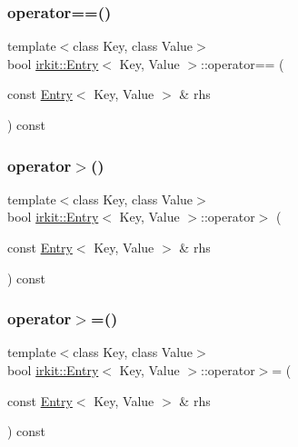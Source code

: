\mbox{\label{structirkit_1_1Entry_aaa12df0ae7e66638a6f0e5ddb552167b}} 
\subsubsection{\texorpdfstring{operator==()}{operator==()}}
{\footnotesize\ttfamily template$<$class Key, class Value$>$ \\
bool \hyperlink{structirkit_1_1Entry}{irkit\+::\+Entry}$<$ Key, Value $>$\+::operator== (\begin{DoxyParamCaption}\item[{const \hyperlink{structirkit_1_1Entry}{Entry}$<$ Key, Value $>$ \&}]{rhs }\end{DoxyParamCaption}) const\hspace{0.3cm}{\ttfamily [inline]}}

\mbox{\label{structirkit_1_1Entry_a0c421723ffe0eb3c56d1efc16f5f2fe5}} 
\subsubsection{\texorpdfstring{operator$>$()}{operator>()}}
{\footnotesize\ttfamily template$<$class Key, class Value$>$ \\
bool \hyperlink{structirkit_1_1Entry}{irkit\+::\+Entry}$<$ Key, Value $>$\+::operator$>$ (\begin{DoxyParamCaption}\item[{const \hyperlink{structirkit_1_1Entry}{Entry}$<$ Key, Value $>$ \&}]{rhs }\end{DoxyParamCaption}) const\hspace{0.3cm}{\ttfamily [inline]}}

\mbox{\label{structirkit_1_1Entry_a672de7d54aa88d29475e8664422a8e4f}} 
\subsubsection{\texorpdfstring{operator$>$=()}{operator>=()}}
{\footnotesize\ttfamily template$<$class Key, class Value$>$ \\
bool \hyperlink{structirkit_1_1Entry}{irkit\+::\+Entry}$<$ Key, Value $>$\+::operator$>$= (\begin{DoxyParamCaption}\item[{const \hyperlink{structirkit_1_1Entry}{Entry}$<$ Key, Value $>$ \&}]{rhs }\end{DoxyParamCaption}) const\hspace{0.3cm}{\ttfamily [inline]}}




